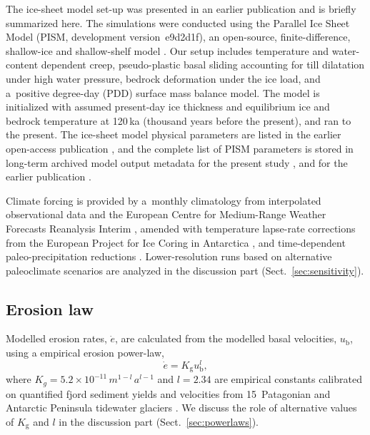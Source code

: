 \documentclass[esurf, manuscript]{copernicus}
\begin{document}
    The ice-sheet model set-up was presented in an earlier publication
    \citep{Seguinot.etal.2018} and is briefly summarized here. The simulations
    were conducted using the Parallel Ice Sheet Model (PISM, development
    version~e9d2d1f), an open-source, finite-difference, shallow-ice and
    shallow-shelf model
    \citep{PISM-authors.2017}. Our setup includes temperature and water-content
    dependent creep, pseudo-plastic basal sliding accounting for till
    dilatation under high water pressure, bedrock deformation under the ice
    load, and a~positive degree-day (PDD) surface mass balance model. The model
    is initialized with assumed present-day ice thickness and equilibrium
    ice and bedrock temperature at 120\,ka (thousand years before the present),
    and ran to the present. The ice-sheet model physical parameters are listed
    in the earlier open-access publication \citep{Seguinot.etal.2018}, and the
    complete list of PISM
    parameters is stored in long-term archived model output metadata for the
    present study \citep{Seguinot.2021}, and for the earlier publication
    \citep{Seguinot.2020, Seguinot.2020a}.

    Climate forcing is provided by a~monthly climatology from interpolated
    observational data \citep[WorldClim;][]{Hijmans.etal.2005} and the European
    Centre for Medium-Range Weather Forecasts Reanalysis Interim
    \citep[ERA-Interim;][]{Dee.etal.2011}, amended with temperature lapse-rate
    corrections from the European Project for Ice Coring in Antarctica
    \citep[EPICA;][] {Jouzel.etal.2007}, and time-dependent paleo-precipitation
    reductions \citep{Huybrechts.2002}. Lower-resolution runs based on
    alternative paleoclimate scenarios \citep{Seguinot.etal.2018} are analyzed
    in the discussion part (Sect.~\ref{sec:sensitivity}).

\subsection{Erosion law}

    Modelled erosion rates, $\dot{e}$, are calculated from the modelled basal
    velocities, $u_\mathrm{b}$, using a empirical erosion power-law,
    \begin{equation}
        \dot{e} = K_\mathrm{g} u_\mathrm{b}^l ,
    \end{equation}
    where $K_g = 5.2\times 10^{-11}\,m^{1-l}\,a^{l-1}$ and $l = 2.34$ are
    empirical constants calibrated on quantified fjord sediment yields and
    velocities from 15~Patagonian and Antarctic Peninsula tidewater glaciers
    \citep{Koppes.etal.2015}. We discuss the role of alternative values of
    $K_\mathrm{g}$ and $l$ in the discussion part (Sect.~\ref{sec:powerlaws}).
\end{document}
